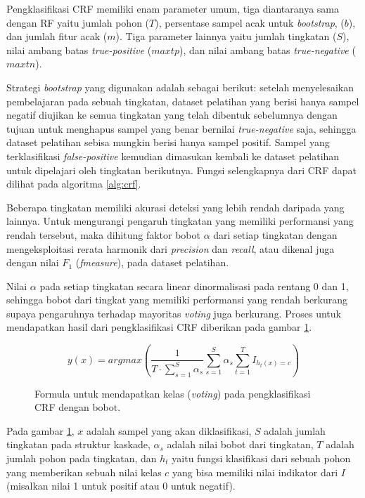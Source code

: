 Pengklasifikasi CRF memiliki enam parameter umum, tiga diantaranya sama dengan
RF yaitu jumlah pohon ($T$), persentase sampel acak untuk \textit{bootstrap},
($b$), dan jumlah fitur acak ($m$).
Tiga parameter lainnya yaitu jumlah tingkatan ($S$), nilai ambang batas
\textit{true-positive} ($maxtp$), dan nilai ambang batas
\textit{true-negative} ($maxtn$).

Strategi \textit{bootstrap} yang digunakan adalah sebagai berikut: setelah
menyelesaikan pembelajaran pada sebuah tingkatan, dataset pelatihan yang berisi
hanya sampel negatif diujikan ke semua tingkatan yang telah dibentuk
sebelumnya dengan tujuan untuk menghapus sampel yang benar bernilai
\textit{true-negative} saja, sehingga dataset pelatihan sebisa mungkin berisi
hanya sampel positif.
Sampel yang terklasifikasi \textit{false-positive} kemudian dimasukan kembali
ke dataset pelatihan untuk dipelajari oleh tingkatan berikutnya.
Fungsi selengkapnya dari CRF dapat dilihat pada algoritma \ref{alg:crf}.

Beberapa tingkatan memiliki akurasi deteksi yang lebih rendah daripada
yang lainnya.
Untuk mengurangi pengaruh tingkatan yang memiliki performansi yang rendah
tersebut, maka dihitung faktor bobot $\alpha$ dari setiap tingkatan dengan
mengeksploitasi rerata harmonik dari \textit{precision} dan \textit{recall},
atau dikenal juga dengan nilai $F_1$ (\textit{fmeasure}),
pada dataset pelatihan.

Nilai $\alpha$ pada setiap tingkatan secara linear dinormalisasi pada rentang 0
dan 1, sehingga bobot dari tingkat yang memiliki performansi yang rendah
berkurang supaya pengaruhnya terhadap mayoritas \textit{voting} juga berkurang.
Proses untuk mendapatkan hasil dari pengklasifikasi CRF diberikan pada gambar
\ref{form:crf}.

\begin{figure}[h]
\[
	y(x) = argmax \left(
			\frac{1}{T \cdot \sum^{S}_{s=1} \alpha_{s} }
			\sum\limits_{s=1}^{S} \alpha_{s}
			\sum\limits^{T}_{t=1} I_{h_{t} (x) = c}
		\right)
\]
\caption{
Formula untuk mendapatkan kelas (\textit{voting}) pada pengklasifikasi CRF
dengan bobot.
}
\label{form:crf}
\end{figure}

Pada gambar \ref{form:crf}, $x$ adalah sampel yang akan diklasifikasi,
$S$ adalah jumlah tingkatan pada struktur kaskade,
$\alpha_{s}$ adalah nilai bobot dari tingkatan,
$T$ adalah jumlah pohon pada tingkatan, dan
$h_{t}$ yaitu fungsi klasifikasi dari sebuah pohon yang memberikan sebuah nilai
kelas $c$ yang bisa memiliki nilai indikator dari $I$
(misalkan nilai 1 untuk positif atau 0 untuk negatif).

